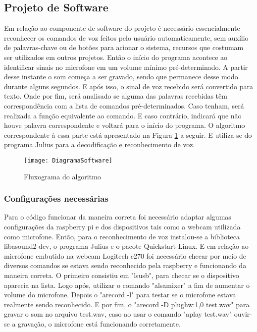 \subsection{Projeto de Software}

Em relação ao componente de software do projeto é necessário essencialmente reconhecer os comandos de voz feitos pelo usuário automaticamente, sem auxílio de palavras-chave ou de botões para acionar o sistema, recursos que costumam ser utilizados em outros projetos. Então o início do programa acontece ao identificar sinais no microfone em um volume mínimo pré-determinado. 
A partir desse instante o som começa a ser gravado, sendo que permanece desse modo durante alguns segundos. E após isso, o sinal de voz recebido será convertido para texto. Onde por fim, será analisado se alguma das palavras recebidas têm correspondência com a lista de comandos pré-determinados. Caso tenham, será realizada a função equivalente ao comando. E caso contrário, indicará que não houve palavra correspondente e voltará para o início do programa.
O algoritmo correspondente à essa parte está apresentado na Figura \ref{fig-DiagramaSoftware} a seguir. E utiliza-se do programa Julius para a decodificação e reconhecimento de voz.

\begin{figure}[htbp]
	\centering
		\texttt{[image: DiagramaSoftware]}
	\caption{Fluxograma do algoritmo}
	\label{fig-DiagramaSoftware}
\end{figure}

\subsubsection{Configurações necessárias}

Para o código funcionar da maneira correta foi necessário adaptar algumas configurações da raspberry pi e dos dispositivos tais como a webcam utilizada como microfone.
Então, para o reconhecimento de voz instalou-se a biblioteca libasound2-dev, o programa Julius e o pacote Quickstart-Linux.
E em relação ao microfone embutido na webcam Logitech c270 foi necessário checar por meio de diversos comandos se estava sendo reconhecido pela raspberry e funcionando da maneira correta.
O primeiro consistiu em "lsusb", para checar se o dispositivo aparecia na lista. Logo após,  utilizar o comando "alsamixer" a fim de aumentar o volume do microfone. Depois o "arecord -l" para testar se o microfone estava realmente sendo reconhecido.
E por fim, o "arecord -D plughw:1,0 test.wav" para gravar o som no arquivo test.wav, caso ao usar o comando "aplay test.wav" ouvir-se a gravação, o microfone está funcionando corretamente. 

